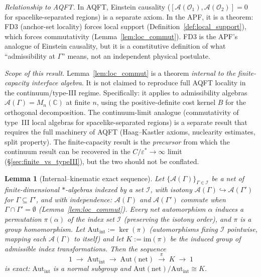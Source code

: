 \documentclass[11pt]{article}
\newtheorem{lemma}[theorem]{Lemma}
\theoremstyle{definition}
\begin{document}
\noindent\textit{Relationship to AQFT.}\quad
In AQFT, Einstein causality ($[\mathcal{A}(\mathcal{O}_1),
\mathcal{A}(\mathcal{O}_2)] = 0$ for spacelike-separated regions) is
a separate axiom.  In the APF, it is a theorem: FD3 (anchor-set
locality) forces local support (Definition~\ref{def:local_support}),
which forces commutativity (Lemma~\ref{lem:loc_commut}).  FD3 is the
APF's analogue of Einstein causality, but it is a constitutive
definition of what ``admissibility at $\Gamma$'' means, not an
independent physical postulate.

\smallskip\noindent\textit{Scope of this result.}\quad
Lemma~\ref{lem:loc_commut} is a theorem \emph{internal to the
finite-capacity interface algebra}.  It is not claimed to reproduce
full AQFT locality in the continuum/type-III regime.  Specifically:
it applies to admissibility algebras $\mathcal{A}(\Gamma) =
M_n(\mathbb{C})$ at finite $n$, using the positive-definite cost
kernel $B$ for the orthogonal decomposition.  The continuum-limit
analogue (commutativity of type~III local algebras for
spacelike-separated regions) is a separate result that requires the
full machinery of AQFT (Haag--Kastler axioms, nuclearity estimates,
split property).  The finite-capacity result is the \emph{precursor}
from which the continuum result can be recovered in the
$C / \varepsilon^* \to \infty$ limit
(\S\ref{sec:finite_vs_typeIII}), but the two should not be
conflated.

\begin{lemma}[Internal--kinematic exact sequence]\label{lem:aut_decomp}
Let $\{\mathcal{A}(\Gamma)\}_{\Gamma \in \mathcal{I}}$ be a net of
finite-dimensional $*$-algebras indexed by a set $\mathcal{I}$, with
isotony $\mathcal{A}(\Gamma) \hookrightarrow \mathcal{A}(\Gamma')$ for
$\Gamma \subseteq \Gamma'$, and with independence: $\mathcal{A}(\Gamma)$
and $\mathcal{A}(\Gamma')$ commute when $\Gamma \cap \Gamma' = \emptyset$
(Lemma~\ref{lem:loc_commut}).  Every net automorphism $\alpha$ induces a
permutation $\pi(\alpha)$ of the index set $\mathcal{I}$ (preserving the
isotony order), and $\pi$ is a group homomorphism.  Let
$\mathrm{Aut}_{\mathrm{int}} := \ker(\pi)$ (automorphisms fixing
$\mathcal{I}$ pointwise, mapping each $\mathcal{A}(\Gamma)$ to itself)
and let $K := \mathrm{im}(\pi)$ be the induced group of admissible
index transformations.  Then the sequence
\[
  1 \;\longrightarrow\; \mathrm{Aut}_{\mathrm{int}}
  \;\longrightarrow\; \mathrm{Aut}(\text{net})
  \;\xrightarrow{\;\pi\;}\; K \;\longrightarrow\; 1
\]
is exact: $\mathrm{Aut}_{\mathrm{int}}$ is a normal subgroup and
$\mathrm{Aut}(\text{net})/\mathrm{Aut}_{\mathrm{int}} \cong K$.
\end{lemma}
\end{document}
